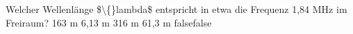    {Welcher Wellenlänge \$\textbackslash\{\}lambda\$ entspricht in etwa die Frequenz 1,84 MHz im Freiraum?}
    {163 m}
    {6,13 m}
    {316 m}
    {61,3 m}
    {false}{false}